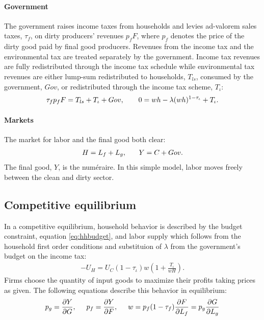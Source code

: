 \paragraph{Government}
The government raises income taxes from households and levies ad-valorem sales taxes, $\tau_f$, on dirty producers' revenues $p_fF$, where $p_f$ denotes the price of the dirty good paid by final good producers. Revenues from the income tax and the environmental tax are treated separately by the government. Income tax revenues are fully redistributed through the income tax schedule while environmental tax revenues are either lump-sum redistributed to households, $T_{ls}$, consumed by the government, $Gov$, or redistributed through the income tax scheme, $T_\iota$:
\begin{align}
\tau_{f}p_fF=T_{ls}+T_\iota+Gov, \hspace{7mm}
0={w h}-\lambda(w h)^{1-\tau_{\iota}}+T_\iota. \label{eq:gov_but}
\end{align}

\paragraph{Markets}
The market for labor and the final good both clear: 
\begin{align}
H=L_f+L_g,\ \hspace{5mm} Y=C+Gov. \label{eq:market_clear}
\end{align}
 The final good, $Y$, is the numéraire. In this simple model, labor moves freely between the clean and dirty sector. 
\subsection{Competitive equilibrium}
In a competitive equilibrium, household behavior is described by the budget constraint, equation \ref{eq:hhbudget}, and labor supply which follows from the household first order conditions and substituion of $\lambda$ from the government's budget on the income tax:
\begin{align}
-U_H=U_C(1-\tau_{\iota})w\left(1+\frac{T_\iota}{wH}\right). \label{eq:hsup}
\end{align}
Firms choose the quantity of input goods to maximize their profits taking prices as given. The following equations describe this behavior in equilibrium:
\begin{align}
p_g=\frac{\partial Y}{\partial G}, \hspace{5mm}
p_f = \frac{\partial Y}{\partial F}, \hspace{5mm}
w= p_f(1-\tau_f)\frac{\partial F}{\partial L_f}=p_g\frac{\partial G}{\partial L_g}\label{eq:profmax}
\end{align}

